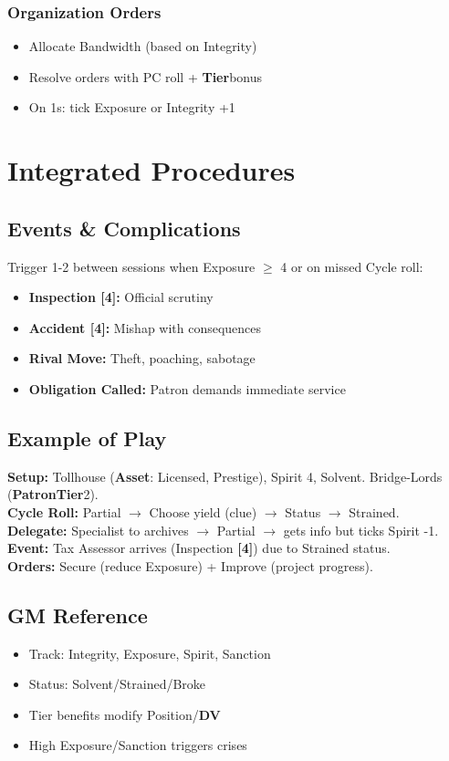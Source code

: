 \documentclass[10pt]{article}
\newcommand{\asset}{\textbf{Asset}}
\newcommand{\patron}{\textbf{Patron}}
\newcommand{\dv}{\textbf{DV}}
\newcommand{\timer}[1]{\textbf{[#1]}}
\newcommand{\tier}{\textbf{Tier}}
\begin{document}
\subsubsection{Organization Orders}
\begin{itemize}[noitemsep]
\item Allocate Bandwidth (based on Integrity)
\item Resolve orders with PC roll + \tier bonus
\item On 1s: tick Exposure or Integrity +1
\end{itemize}

\section{Integrated Procedures}

\subsection{Events \& Complications}
Trigger 1-2 between sessions when Exposure $\geq$ 4 or on missed Cycle roll:
\begin{itemize}[noitemsep]
\item \textbf{Inspection \timer{4}:} Official scrutiny
\item \textbf{Accident \timer{4}:} Mishap with consequences
\item \textbf{Rival Move:} Theft, poaching, sabotage
\item \textbf{Obligation Called:} Patron demands immediate service
\end{itemize}

\subsection{Example of Play}
\textbf{Setup:} Tollhouse (\asset: Licensed, Prestige), Spirit 4, Solvent. Bridge-Lords (\patron \tier 2). \\
\textbf{Cycle Roll:} Partial $\rightarrow$ Choose yield (clue) $\rightarrow$ Status $\rightarrow$ Strained. \\
\textbf{Delegate:} Specialist to archives $\rightarrow$ Partial $\rightarrow$ gets info but ticks Spirit -1. \\
\textbf{Event:} Tax Assessor arrives (Inspection \timer{4}) due to Strained status. \\
\textbf{Orders:} Secure (reduce Exposure) + Improve (project progress).

\subsection*{GM Reference}
\begin{itemize}[noitemsep]
\item Track: Integrity, Exposure, Spirit, Sanction
\item Status: Solvent/Strained/Broke
\item Tier benefits modify Position/\dv
\item High Exposure/Sanction triggers crises
\end{itemize}
\end{document}
